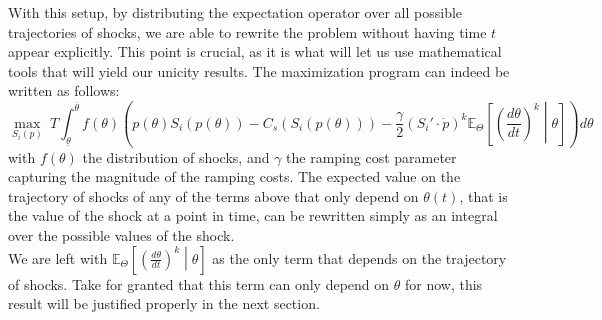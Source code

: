 With this setup, by distributing the expectation operator over all possible trajectories of shocks, we are able to rewrite the problem without having time $t$ appear explicitly. This point is crucial, as it is what will let us use mathematical tools that will yield our unicity results. The maximization program can indeed be written as follows:
\begin{equation}
\displaystyle{\max_{S_i(p)}}~T\int_{\underline{\theta}}^{\overline{\theta}} f(\theta)\left(p(\theta)S_i(p(\theta)) -C_s(S_i(p(\theta)))-\frac{\gamma}{2}\left(S_i'\cdot\dot{p}\right)^k\mathbb{E}_{\Theta}\left[\left(\frac{d\theta}{dt}\right)^k\middle \vert \theta  \right]\right)d\theta
\label{maxbase}
\end{equation}
with $f(\theta)$ the distribution of shocks, and $\gamma$ the ramping cost parameter capturing the magnitude of the ramping costs. The expected value on the trajectory of shocks of any of the terms above that only depend on $\theta(t)$, that is the value of the shock at a point in time, can be rewritten simply as an integral over the possible values of the shock. \\

We are left with $\mathbb{E}_{\Theta}\left[\left(\frac{d\theta}{dt}\right)^k\middle \vert \theta  \right]$ as the only term that depends on the trajectory of shocks. Take for granted that this term can only depend on $\theta$ for now, this result will be justified properly in the next section. \\

